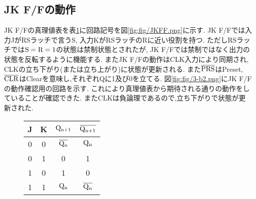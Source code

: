 \subsection{JK F/Fの動作}
JK F/Fの真理値表を表\ref{tab:JKFF}に回路記号を図\ref{fig:fig/JKFF.png}に示す.
JK F/Fでは入力JがRSラッチで言うS,
入力KがRSラッチのRに近い役割を持つ.
ただしRSラッチでは$\rm S=R=1$の状態は禁制状態とされたが,
JK F/Fでは禁制ではなく出力の状態を反転するように機能する.
またJK F/Fの動作はCLK入力により同期され,
CLKの立ち下がり(または立ち上がり)に状態が更新される.
また$\rm\overline{PRS}$はPreset,
$\rm\overline{CLR}$はClearを意味し,それぞれQに1及び0を立てる.
図\ref{fig:fig/3-b2.png}にJK F/Fの動作確認用の回路を示す.
これにより真理値表から期待される通りの動作をしていることが確認できた.
またCLKは負論理であるので,立ち下がりで状態が更新された.
\begin{figure}[h]
  \def\@captype{table}
  \begin{minipage}[t]{.48\textwidth}
    \begin{center}
      \begin{tabular}{cccc}
        \hline
        J & K & $\rm Q_{n+1}$ & $\rm\overline{Q_{n+1}}$\\
        \hline
        0 & 0 & $\rm \overline{Q_n}$ & $\rm Q_n$\\
        0 & 1 & 0 & 1\\
        1 & 0 & 1 & 0\\
        1 & 1 & $\rm Q_n$ & $\rm \overline{Q_n}$\\
        \hline
      \end{tabular}
    \end{center}
    \label{tab:JKFF}
  \end{minipage}
  \hfill
  \begin{minipage}[c]{.48\textwidth}
  \end{minipage}
\end{figure}
